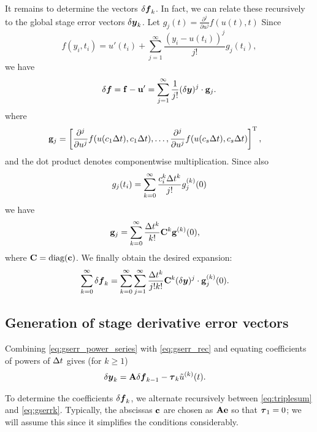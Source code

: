 It remains to determine the vectors $\delta\boldsymbol{f}_k$. In fact, 
we can relate these recursively to the global stage error vectors $\delta\boldsymbol{y}_k$.
Let $g_{j}(t) = \frac{\partial^j}{\partial u^j} f(u(t),t)$
Since
$$
f(y_i, t_i) = u'(t_i) + \sum_{j=1}^\infty \frac{(y_i - u(t_i))^j}{j!} g_{j}(t_i),
$$
we have
\begin{align}
  \delta\boldsymbol{f} = \mathbf{f} - \mathbf{u}' = \sum_{j=1}^\infty \frac{1}{j!} (\delta\boldsymbol{y})^j \cdot
          \mathbf{g}_j.
\end{align}
where 
\begin{align*}
\mathbf{g}_j & = \left[\frac{\partial^j}{\partial u^j}f(u(c_1\Delta t),c_1\Delta t),\dots,\frac{\partial^j}{\partial u^j}f(u(c_s \Delta t),c_s \Delta t)\right]^\mathrm{T},
\end{align*}
and the dot product denotes componentwise multiplication.
Since also
$$
g_j(t_i) = \sum_{k=0}^\infty \frac{c_i^k \Delta t^k}{j!} g_j^{(k)}(0)
$$
we have
\begin{align}
    \mathbf{g}_j & = \sum_{k=0}^\infty \frac{\Delta t^k}{k!} \mathbf{C}^k \mathbf{g}^{(k)}(0),
\end{align}
where $\mathbf{C}=\textup{diag}(\mathbf{c})$.  We finally obtain the desired expansion:
\begin{align} \label{eq:triplesum}
    \sum_{k=0}^\infty \delta\boldsymbol{f}_k & = \sum_{k=0}^\infty \sum_{j=1}^\infty \frac{\Delta t^k}{j!k!} \mathbf{C}^k (\delta\boldsymbol{y})^j \cdot \mathbf{g}_j^{(k)}(0).
\end{align}

\subsection{Generation of stage derivative error vectors\label{recursion}}
Combining \eqref{eq:gserr_power_series} with \eqref{eq:gserr_rec} and equating
coefficients of powers of $\Delta t$ gives (for $k\ge 1$)
\begin{align} \label{eq:gserrk}
\delta\boldsymbol{y}_k & = \mathbf{A} \delta\boldsymbol{f}_{k-1} - \boldsymbol{\tau}_k \tilde{u}^{(k)}(t).
\end{align}

To determine the coefficients $\delta\boldsymbol{f}_k$, we alternate recursively 
between \eqref{eq:triplesum} and \eqref{eq:gserrk}.
Typically, the abscissas $\mathbf{c}$ are chosen as $\mathbf{A}\mathbf{e}$ so that $\boldsymbol{\tau}_1=0$; 
we will assume this since it simplifies the conditions considerably.

